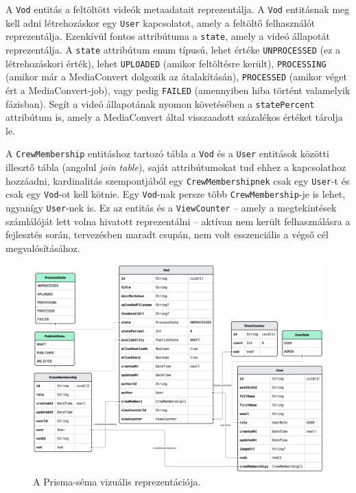 A \verb|Vod| entitás a feltöltött videók metaadatait reprezentálja. A \verb|Vod| entitásnak meg kell adni létrehozáskor egy \verb|User| kapcsolatot, amely a feltöltő felhasználót reprezentálja. Ezenkívül fontos attribútuma a \verb|state|, amely a videó állapotát reprezentálja. A \verb|state| attribútum enum típusú, lehet értéke \verb|UNPROCESSED| (ez a létrehozáskori érték), lehet \verb|UPLOADED| (amikor feltöltésre került), \verb|PROCESSING| (amikor már a MediaConvert dolgozik az átalakításán), \verb|PROCESSED| (amikor véget ért a MediaConvert-job), vagy pedig \verb|FAILED| (amennyiben hiba történt valamelyik fázisban). Segít a videó állapotának nyomon követésében a \verb|statePercent| attribútum is, amely a MediaConvert által visszaadott százalékos értéket tárolja le.

A \verb|CrewMembership| entitáshoz tartozó tábla a \verb|Vod| és a \verb|User| entitások közötti illesztő tábla (angolul \emph{join table}), saját attribútumokat tud ehhez a kapcsolathoz hozzáadni, kardinalitás szempontjából egy \verb|CrewMembershipnek| csak egy \verb|User|-t és csak egy \verb|Vod|-ot kell kötnie. Egy \verb|Vod|-nak persze több \verb|CrewMembership|-je is lehet, ugyanígy \verb|User|-nek is. Ez az entitás és a \verb|ViewCounter| -- amely a megtekintések számlálóját lett volna hivatott reprezentálni -- aktívan nem került felhasználásra a fejlesztés során, tervezésben maradt csupán, nem volt esszenciális a végső cél megvalósításához.

\begin{figure}[h]
  \centering
  \includegraphics[width=155mm, keepaspectratio]{figures/prismaliser.png}
  \caption{A Prisma-séma vizuális reprezentációja.}
  \label{fig:prismaliser}
\end{figure}

